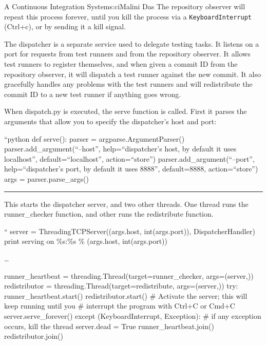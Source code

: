 \begin{aosachapter}{A Continuous Integration System}{s:ci}{Malini Das}
The repository observer will repeat this process forever, until you kill
the process via a \texttt{KeyboardInterrupt} (Ctrl+c), or by sending it
a kill signal.

\label{the-dispatcher-dispatcher.py}

The dispatcher is a separate service used to delegate testing tasks. It
listens on a port for requests from test runners and from the repository
observer. It allows test runners to register themselves, and when given
a commit ID from the repository observer, it will dispatch a test runner
against the new commit. It also gracefully handles any problems with the
test runners and will redistribute the commit ID to a new test runner if
anything goes wrong.

When dispatch.py is executed, the serve function is called. First it
parses the arguments that allow you to specify the dispatcher's host and
port:

``python def serve(): parser = argparse.ArgumentParser()
parser.add\_argument(``--host'', help=``dispatcher's host, by default it
uses localhost'', default=``localhost'', action=``store'')
parser.add\_argument(``--port'', help=``dispatcher's port, by default it
uses 8888'', default=8888, action=``store'') args = parser.parse\_args()

\begin{center}\rule{3in}{0.4pt}\end{center}

This starts the dispatcher server, and two other threads. One thread
runs the runner\_checker function, and other runs the redistribute
function.

\begin{aosadescription}
\item[``]
server = ThreadingTCPServer((args.host, int(args.port)),
DispatcherHandler) print serving on \%s:\%s \% (args.host,
int(args.port))

\ldots{}

runner\_heartbeat = threading.Thread(target=runner\_checker,
args=(server,)) redistributor = threading.Thread(target=redistribute,
args=(server,)) try: runner\_heartbeat.start() redistributor.start() \#
Activate the server; this will keep running until you \# interrupt the
program with Ctrl+C or Cmd+C server.serve\_forever() except
(KeyboardInterrupt, Exception): \# if any exception occurs, kill the
thread server.dead = True runner\_heartbeat.join() redistributor.join()
\end{aosadescription}


\end{aosachapter}
